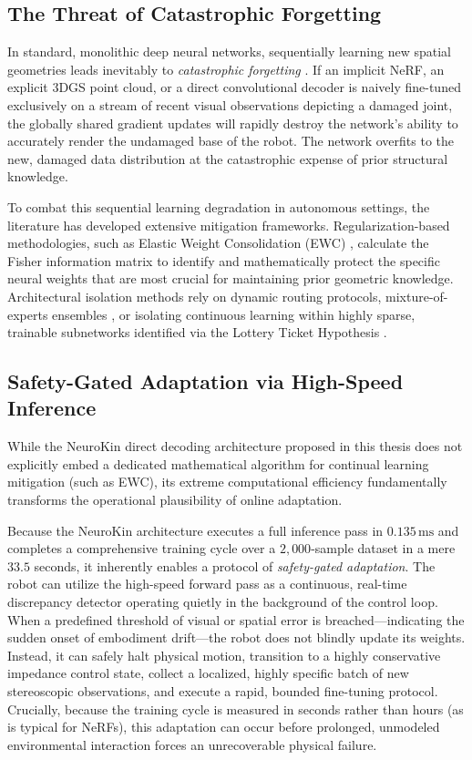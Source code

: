 \documentclass[12pt,a4paper,oneside]{report}
\begin{document}
\subsection{The Threat of Catastrophic Forgetting}

In standard, monolithic deep neural networks, sequentially learning new spatial geometries leads inevitably to \textit{catastrophic forgetting} \cite{mccloskey1989catastrophic}. If an implicit NeRF, an explicit 3DGS point cloud, or a direct convolutional decoder is naively fine-tuned exclusively on a stream of recent visual observations depicting a damaged joint, the globally shared gradient updates will rapidly destroy the network's ability to accurately render the undamaged base of the robot. The network overfits to the new, damaged data distribution at the catastrophic expense of prior structural knowledge.

To combat this sequential learning degradation in autonomous settings, the literature has developed extensive mitigation frameworks. Regularization-based methodologies, such as Elastic Weight Consolidation (EWC) \cite{kirkpatrick2017overcoming}, calculate the Fisher information matrix to identify and mathematically protect the specific neural weights that are most crucial for maintaining prior geometric knowledge. Architectural isolation methods rely on dynamic routing protocols, mixture-of-experts ensembles \cite{mocanu2018scalable}, or isolating continuous learning within highly sparse, trainable subnetworks identified via the Lottery Ticket Hypothesis \cite{frankle2018lottery}.

\subsection{Safety-Gated Adaptation via High-Speed Inference}

While the NeuroKin direct decoding architecture proposed in this thesis does not explicitly embed a dedicated mathematical algorithm for continual learning mitigation (such as EWC), its extreme computational efficiency fundamentally transforms the operational plausibility of online adaptation. 

Because the NeuroKin architecture executes a full inference pass in $0.135\,\mathrm{ms}$ and completes a comprehensive training cycle over a $2,000$-sample dataset in a mere $33.5$ seconds, it inherently enables a protocol of \textit{safety-gated adaptation}. The robot can utilize the high-speed forward pass as a continuous, real-time discrepancy detector operating quietly in the background of the control loop. When a predefined threshold of visual or spatial error is breached—indicating the sudden onset of embodiment drift—the robot does not blindly update its weights. Instead, it can safely halt physical motion, transition to a highly conservative impedance control state, collect a localized, highly specific batch of new stereoscopic observations, and execute a rapid, bounded fine-tuning protocol. Crucially, because the training cycle is measured in seconds rather than hours (as is typical for NeRFs), this adaptation can occur before prolonged, unmodeled environmental interaction forces an unrecoverable physical failure.
\end{document}
